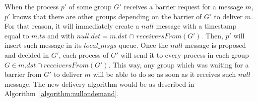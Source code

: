 \documentclass[times, 10pt]{article}
\begin{document}
When the process $p'$ of some group $G'$ receives a barrier request for a message $m$, %
$p'$ knows that there are other groups depending on the barrier of $G'$ to deliver $m$. For that reason, it will immediately create a $null$ message with a timestamp equal to $m.ts$ and with $null.dst = m.dst$ $\cap$ $receiversFrom(G')$. Then, $p'$ will insert such message in its %
$local\_msgs$ queue. %
Once the $null$ message is proposed and decided in $G'$, each process of $G'$ will send it to every process in each group \mbox{$G \in m.dst \cap receiversFrom(G')$}. This way, any group which was waiting for a barrier from $G'$ to deliver $m$ will be able to do so as soon as it receives such $null$ message. The new delivery algorithm would be as described in \mbox{Algorithm {\ref{algorithm:nullondemand}}}.
\end{document}
